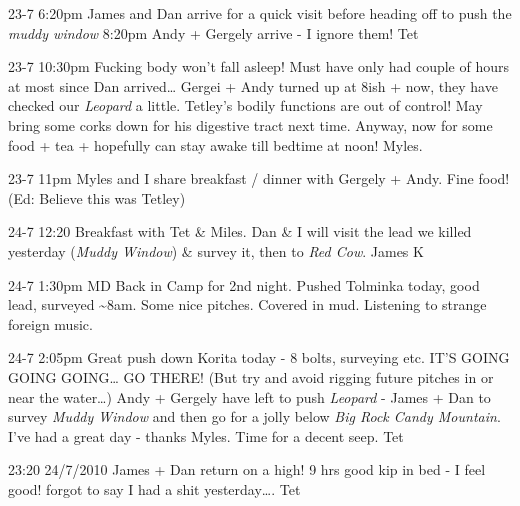 23-7 6:20pm James and Dan arrive for a quick visit before heading off to
push the \emph{muddy window} 8:20pm Andy + Gergely arrive - I ignore
them! Tet

23-7 10:30pm Fucking body won't fall asleep! Must have only had couple
of hours at most since Dan arrived\ldots{} Gergei + Andy turned up at
8ish + now, they have checked our \emph{Leopard} a little. Tetley's
bodily functions are out of control! May bring some corks down for his
digestive tract next time. Anyway, now for some food + tea + hopefully
can stay awake till bedtime at noon! Myles.

23-7 11pm Myles and I share breakfast / dinner with Gergely + Andy. Fine
food! (Ed: Believe this was Tetley)

24-7 12:20 Breakfast with Tet \& Miles. Dan \& I will visit the lead we
killed yesterday (\emph{Muddy Window}) \& survey it, then to \emph{Red
Cow}. James K

24-7 1:30pm MD Back in Camp for 2nd night. Pushed Tolminka today, good
lead, surveyed \textasciitilde 8am. Some nice pitches. Covered in mud.
Listening to strange foreign music.

24-7 2:05pm Great push down Korita today - 8 bolts, surveying etc. IT'S
GOING GOING GOING\ldots{} GO THERE! (But try and avoid rigging future
pitches in or near the water\ldots{}) Andy + Gergely have left to push
\emph{Leopard} - James + Dan to survey \emph{Muddy Window} and then go
for a jolly below \emph{Big Rock Candy Mountain}. I've had a great day -
thanks Myles. Time for a decent seep. Tet

23:20 24/7/2010 James + Dan return on a high! 9 hrs good kip in bed - I
feel good! forgot to say I had a shit yesterday\ldots{}. Tet

